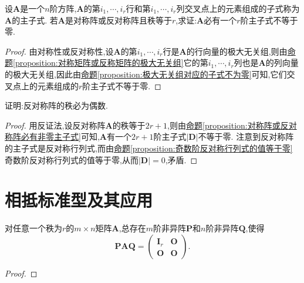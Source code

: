 \documentclass[lang=cn,newtx,10pt,scheme=chinese]{elegantbook}
\begin{document}
\begin{proposition}\label{proposition:对称阵或反对称阵必有非零主子式}
设\(\boldsymbol{A}\)是一个\(n\)阶方阵,\(\boldsymbol{A}\)的第\(i_1,\cdots,i_r\)行和第\(i_1,\cdots,i_r\)列交叉点上的元素组成的子式称为\(\boldsymbol{A}\)的主子式. 若\(\boldsymbol{A}\)是对称阵或反对称阵且秩等于\(r\),求证:\(\boldsymbol{A}\)必有一个\(r\)阶主子式不等于零.
\end{proposition}
\begin{proof}
由对称性或反对称性,设\(\boldsymbol{A}\)的第\(i_1,\cdots,i_r\)行是\(\boldsymbol{A}\)的行向量的极大无关组,则由\hyperref[proposition:对称矩阵或反称矩阵的极大无关组]{命题\ref{proposition:对称矩阵或反称矩阵的极大无关组}}它的第\(i_1,\cdots,i_r\)列也是\(\boldsymbol{A}\)的列向量的极大无关组,因此由\hyperref[proposition:极大无关组对应的子式不为零]{命题\ref{proposition:极大无关组对应的子式不为零}}可知,它们交叉点上的元素组成的\(r\)阶主子式不等于零. 
\end{proof}

\begin{proposition}[反对称阵的秩必为偶数]\label{proposition:反对称阵的秩必为偶数}
证明:反对称阵的秩必为偶数.
\end{proposition}
\begin{proof}
用反证法,设反对称阵\(\boldsymbol{A}\)的秩等于\(2r + 1\),则由\hyperref[proposition:对称阵或反对称阵必有非零主子式]{命题\ref{proposition:对称阵或反对称阵必有非零主子式}}可知,\(\boldsymbol{A}\)有一个\(2r + 1\)阶主子式\(|\boldsymbol{D}|\)不等于零. 注意到反对称阵的主子式是反对称行列式,而由\hyperref[proposition:奇数阶反对称行列式的值等于零]{命题\ref{proposition:奇数阶反对称行列式的值等于零}}奇数阶反对称行列式的值等于零,从而\(|\boldsymbol{D}| = 0\),矛盾.
\end{proof}









\section{相抵标准型及其应用}

\begin{theorem}[矩阵的相抵标准型]\label{theorem:矩阵的相抵标准型}
对任意一个秩为\(r\)的\(m\times n\)矩阵\(\boldsymbol{A}\),总存在\(m\)阶非异阵\(\boldsymbol{P}\)和\(n\)阶非异阵\(\boldsymbol{Q}\),使得
\[
\boldsymbol{P}\boldsymbol{A}\boldsymbol{Q}=\begin{pmatrix}
\boldsymbol{I}_r&\boldsymbol{O}\\
\boldsymbol{O}&\boldsymbol{O}
\end{pmatrix}.
\]
\end{theorem}
\begin{proof}

\end{proof}
\end{document}

